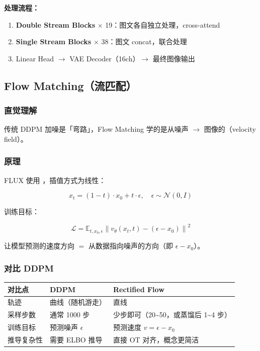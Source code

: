 \textbf{处理流程：}
\begin{enumerate}[leftmargin=1.5em]
  \item \textbf{Double Stream Blocks} $\times$ 19：图文各自独立处理，cross-attend
  \item \textbf{Single Stream Blocks} $\times$ 38：图文 concat，联合处理
  \item Linear Head $\to$ VAE Decoder（16ch）$\to$ 最终图像输出
\end{enumerate}

\subsection{Flow Matching（流匹配）}

\subsubsection{直觉理解}

\begin{intubox}
传统 DDPM 加噪是「弯路」，Flow Matching 学的是从噪声 $\to$ 图像的（velocity field）。
\end{intubox}

\subsubsection{原理}

FLUX 使用 ，插值方式为线性：

$$x_t = (1-t) \cdot x_0 + t \cdot \epsilon, \quad \epsilon \sim \mathcal{N}(0, I)$$

训练目标：

$$\mathcal{L} = \mathbb{E}_{t, x_0, \epsilon} \left\| v_\theta(x_t, t) - (\epsilon - x_0) \right\|^2$$

让模型预测的速度方向 $=$ 从数据指向噪声的方向（即 $\epsilon - x_0$）。

\subsubsection{对比 DDPM}

\begin{summarybox}
\begin{center}
{\small
\begin{tabular}{p{3cm}p{4.5cm}p{4.5cm}}
\hline
\textbf{对比点} & \textbf{DDPM} & \textbf{Rectified Flow} \\
\hline
轨迹 & 曲线（随机游走） & 直线 \\
采样步数 & 通常 1000 步 & 少步即可（20\textasciitilde50，或蒸馏后 1\textasciitilde4 步）\\
训练目标 & 预测噪声 $\epsilon$ & 预测速度 $v = \epsilon - x_0$ \\
推导复杂性 & 需要 ELBO 推导 & 直接 OT 对齐，概念更简洁 \\
\hline
\end{tabular}
}
\end{center}
\end{summarybox}

